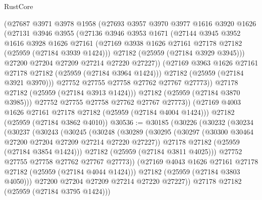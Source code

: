 \begin{lexlean}{RustCore}
\begin{coremodule}
              (@27687
                @3971
                @3978
                @1958
                (@27693
                  @3957
                  @3970
                  @3977
                  @1616
                  @3920
                  @1626
                  (@27131
                    @3946
                    @3955
                    (@27136
                      @3946
                      @3953
                      @1671
                      (@27144
                        @3945
                        @3952
                        @1616
                        @3928
                        @1626
                        @27161
                        (@27169 @3938 @1626 @27161 @27178 @27182 (@25959 (@27184 @3939 @1424)))
                        @27182
                        (@25959 (@27184 @3929 @3945)))
                      @27200
                      @27204
                      @27209
                      @27214
                      @27220
                      @27227))
                  (@27169 @3963 @1626 @27161 @27178 @27182 (@25959 (@27184 @3964 @1424)))
                  @27182
                  (@25959 (@27184 @3921 @3970)))
                @27752
                @27755
                @27758
                @27762
                @27767
                @27773))
            @27178
            @27182
            (@25959 (@27184 @3913 @1424)))
          @27182
          (@25959 (@27184 @3870 @3985)))
        @27752
        @27755
        @27758
        @27762
        @27767
        @27773))
    (@27169 @4003 @1626 @27161 @27178 @27182 (@25959 (@27184 @4004 @1424)))
    @27182
    (@25959 (@27184 @3862 @4010))
@30536 := @30185
    (@30226
      (@30232
        (@30234
          (@30237
            (@30243
              (@30245
                (@30248
                  (@30289
                    (@30295
                      (@30297 (@30300 @30464 @27200 @27204 @27209 @27214 @27220 @27227))
                      @27178
                      @27182
                      (@25959 (@27184 @3854 @1424)))
                    @27182
                    (@25959 (@27184 @3811 @4025)))
                  @27752
                  @27755
                  @27758
                  @27762
                  @27767
                  @27773))
              (@27169 @4043 @1626 @27161 @27178 @27182 (@25959 (@27184 @4044 @1424)))
              @27182
              (@25959 (@27184 @3803 @4050)))
            @27200
            @27204
            @27209
            @27214
            @27220
            @27227))
        @27178
        @27182
        (@25959 (@27184 @3795 @1424)))

\end{coremodule}
\end{lexlean}
